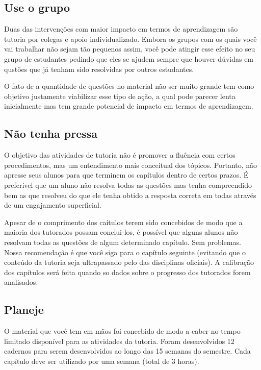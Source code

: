 \documentclass[openany]{book}
\begin{document}
\subsection{Use o grupo}

Duas das intervenções com maior impacto em termos de aprendizagem são tutoria por colegas e apoio individualizado. Embora os grupos com os quais você vai trabalhar não sejam tão pequenos assim, você pode atingir esse efeito no seu grupo de estudantes pedindo que eles se ajudem sempre que houver dúvidas em qustões que já tenham sido resolvidas por outros estudantes.

O fato de a quantidade de questões no material não ser muito grande tem como objetivo justamente viabilizar esse tipo de ação, a qual pode parecer lenta inicialmente mas tem grande potencial de impacto em termos de aprendizagem.

\subsection{Não tenha pressa}

O objetivo das atividades de tutoria não é promover a fluência com certos procedimentos, mas um entendimento mais conceitual dos tópicos. Portanto, não apresse seus alunos para que terminem os capítulos dentro de certos prazos. É preferível que um aluno não resolva todas as questões mas tenha compreendido bem as que resolveu do que ele tenha obtido a resposta correta em todas através de um engajamento superficial.

Apesar de o comprimento dos caítulos terem sido concebidos de modo que a maioria dos tutorados possam conclui-los, é possível que alguns alunos não resolvam todas as questões de algum determinado capítulo. Sem problemas. Nossa recomendação é que você siga para o capítulo seguinte (evitando que o conteúdo da tutoria seja ultrapassado pelo das disciplinas oficiais). A calibração dos capítulos será feita quando so dados sobre o progresso dos tutorados forem analisados.

\subsection{Planeje}

O material que você tem em mãos foi concebido de modo a caber no tempo limitado disponível para as atividades da tutoria. Foram desenvolvidos 12 cadernos para serem desenvolvidos ao longo das 15 semanas do semestre. Cada capítulo deve ser utilizado por uma semana (total de 3 horas).
\end{document}
